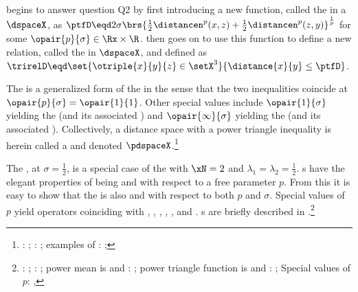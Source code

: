  begins to answer question Q2 by first introducing a new function, 
called the 
in a  $\dspaceX$, as 
\quad$\ptfD\eqd 2\sigma\brs{\frac{1}{2}\distancen^p(x,z) + \frac{1}{2}\distancen^p(z,y)}^\frac{1}{p}$\quad
for some $\opair{p}{\sigma}\in\Rx\times\R$.
 then goes on to use this function to define a new relation, called the 
 in $\dspaceX$, and defined as 
\\\indentx$\trirelD\eqd\set{\otriple{x}{y}{z}\in\setX^3}{\distance{x}{y}\le\ptfD}$.

The   is a generalized form of the 
 in the sense that 
the two inequalities coincide at $\opair{p}{\sigma}=\opair{1}{1}$.
Other special values include $\opair{1}{\sigma}$ yielding the  
(and its associated )
and $\opair{\infty}{\sigma}$ yielding the  
(and its associated ).
Collectively, a distance space with a power triangle inequality is herein called a 
and denoted $\pdspaceX$.\footnote{
  : ;
  : ;
  examples of : ;
  }

The , at $\sigma=\frac{1}{2}$, is a special case of the  with $\xN=2$ 
and $\lambda_1=\lambda_2=\frac{1}{2}$.
s have the elegant properties of being  and  with respect
to a free parameter $p$.
From this it is easy to show that the  is also 
 and  with respect to both $p$ and $\sigma$.
Special values of $p$ yield operators coinciding with , , , ,
, and .
s are briefly described in .\footnote{
  : ;
  : ;
  power mean is  and : ;
  power triangle function is  and : ;
  Special values of $p$: , 
  }

